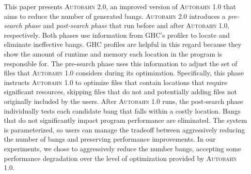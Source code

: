 \documentclass[format=sigplan, review=true, 9pt]{acmart}
\newcommand{\Ao}[0]{\textsc{Autobahn 1.0}}
\newcommand{\At}[0]{\textsc{Autobahn 2.0}}
\newcommand{\preopt}[0]{pre-search}
\newcommand{\postopt}[0]{post-search}
\begin{document}
This paper presents \At{}, an improved version of \Ao{} that aims
to reduce the number of generated bangs. 
\At{} introduces a \textit{\preopt{} phase} and
\textit{\postopt{} phase} that run before and after \Ao{},
respectively.  Both phases use information from GHC's profiler to
locate and eliminate ineffective bangs. 
GHC profiles are helpful in this regard because they
show the amount of runtime and memory each location in the
program is responsible for. The \preopt{} phase uses this information to adjust the set of files that
\Ao{} considers during its optimization.
Specifically, this phase instructs \Ao{} to
optimize files that contain locations that require significant
resources, skipping files that do not and
potentially adding files not originally included by the users.
After \Ao{} runs, the \postopt{} phase individually tests
each candidate bang that falls within a costly location. Bangs that
do not significantly impact program performance are
eliminated.   The system is parameterized, so users can manage the
tradeoff between aggressively reducing the number of bangs and
preserving performance improvements.  In our experiments, we chose to
aggressively reduce the number bangs, accepting some performance
degradation over the level of optimization provided by \Ao{}.
\end{document}
